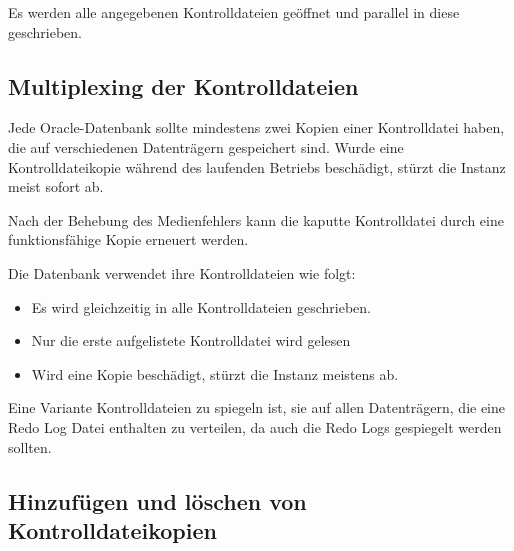         \begin{merke}
          Es werden alle angegebenen Kontrolldateien geöffnet und parallel in diese geschrieben.
        \end{merke}
      \subsection{Multiplexing der Kontrolldateien}
        Jede Oracle-Datenbank sollte mindestens zwei Kopien einer Kontrolldatei
        haben, die auf verschiedenen Datenträgern gespeichert sind.
        Wurde eine Kontrolldateikopie während des laufenden Betriebs
        beschädigt, stürzt die Instanz meist sofort ab.

        Nach der Behebung des Medienfehlers kann die kaputte Kontrolldatei durch eine funktionsfähige Kopie erneuert werden.

        Die Datenbank verwendet ihre Kontrolldateien wie folgt:
        \begin{itemize}
          \item Es wird gleichzeitig in alle Kontrolldateien geschrieben.
          \item Nur die erste aufgelistete Kontrolldatei wird gelesen
          \item Wird eine Kopie beschädigt, stürzt die Instanz meistens ab.
        \end{itemize}
        Eine Variante Kontrolldateien zu spiegeln ist, sie auf allen Datenträgern, die eine Redo Log Datei enthalten zu verteilen, da auch die Redo Logs gespiegelt werden sollten.
      \subsection{Hinzufügen und löschen von Kontrolldateikopien}
